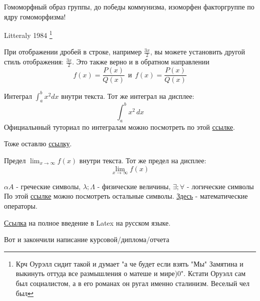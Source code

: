\documentclass[14pt, a4paper]{extarticle}
\begin{document}

		Гомоморфный образ группы, до победы коммунизма, изоморфен факторгруппе по ядру гомоморфизма!


		Litteraly 1984
		\footnote{
		Крч Оурэлл сидит такой и думает "а че будет если взять "Мы" Замятина и выкинуть
		оттуда все размышления о матеше и мире)0". Кстати Оруэлл сам был социалистом, а в его романах он ругал именно сталинизм. Веселый чел был
		}

    При отображении дробей в строке, например \(\frac{3x}{2}\),
    вы можете установить другой стиль отображения:
    \( \displaystyle \frac{3x}{2} \).
    Это также верно и в обратном направлении
    \[ f(x)=\frac{P(x)}{Q(x)} \ \ \textrm{и}
    \ \ f(x)=\textstyle\frac{P(x)}{Q(x)} \]

    Интеграл \(\int_{a}^{b} x^2 dx\) внутри текста.
    \medskip
    Тот же интеграл на дисплее:
    \[
    \int_{a}^{b} x^2 \,dx
    \]
    Официальнный туториал по интегралам можно посмотреть по этой  \href{https://www.overleaf.com/learn/latex/Integrals,_sums_and_limits#Integrals}{ссылке}.

    Тоже оставлю \href{https://www.overleaf.com/learn/latex/Integrals,_sums_and_limits#Sums_and_products}{ссылку}.


    Предел \(\lim_{x\to\infty} f(x)\) внутри текста.
    Тот же предел на дисплее:
    \[
    \lim_{x\to\infty} f(x)
    \]

$\alpha A$ - греческие символы,  $ \lambda; \Lambda$ - физические величины, $\exists; \forall$ - логические символы\\
По этой   \href{https://www.overleaf.com/learn/latex/List_of_Greek_letters_and_math_symbols}{ссылке} можно посмотреть остальные символы. \href{https://www.overleaf.com/learn/latex/Operators}{Здесь} - математические операторы.



\href{https://www.texlive.info/CTAN/info/lshort/russian/lshortru.pdf}{Ссылка} на полное введение в Latex на русском языке.


\newpage
{}
Вот и закончили написание курсовой/диплома/отчета



\newpage


\newpage
\renewcommand*\refname{Список приложений}
\nocite{*}

\end{document}
